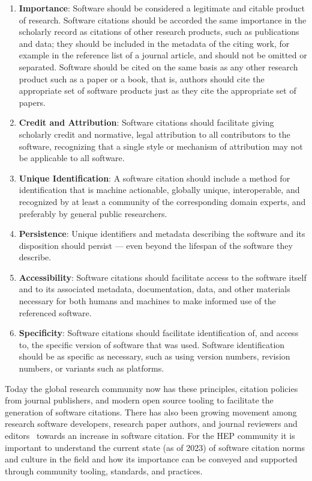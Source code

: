\begin{enumerate}
    \item \textbf{Importance}: Software should be considered a legitimate and citable product of research.
Software citations should be accorded the same importance in the scholarly record as citations of other research products, such as publications and data; they should be included in the metadata of the citing work, for example in the reference list of a journal article, and should not be omitted or separated.
Software should be cited on the same basis as any other research product such as a paper or a book, that is, authors should cite the appropriate set of software products just as they cite the appropriate set of papers.
    \item \textbf{Credit and Attribution}: Software citations should facilitate giving scholarly credit and normative, legal attribution to all contributors to the software, recognizing that a single style or mechanism of attribution may not be applicable to all software.
    \item \textbf{Unique Identification}: A software citation should include a method for identification that is machine actionable, globally unique, interoperable, and recognized by at least a community of the corresponding domain experts, and preferably by general public researchers.
    \item \textbf{Persistence}: Unique identifiers and metadata describing the software and its disposition should persist --- even beyond the lifespan of the software they describe.
    \item \textbf{Accessibility}: Software citations should facilitate access to the software itself and to its associated metadata, documentation, data, and other materials necessary for both humans and machines to make informed use of the referenced software.
    \item \textbf{Specificity}: Software citations should facilitate identification of, and access to, the specific version of software that was used.
Software identification should be as specific as necessary, such as using version numbers, revision numbers, or variants such as platforms.
\end{enumerate}

Today the global research community now has these principles, citation policies from journal publishers, and modern open source tooling to facilitate the generation of software citations.
There has also been growing movement among research software developers, research paper authors, and journal reviewers and editors~\cite{smith_journal_2018} towards an increase in software citation.
For the HEP community it is important to understand the current state (as of 2023) of software citation norms and culture in the field and how its importance can be conveyed and supported through community tooling, standards, and practices.
